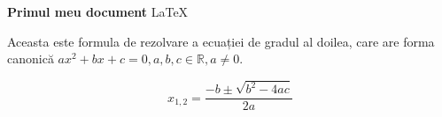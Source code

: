 \documentclass[a4paper]{article}
\begin{document}
\begin{center}
    {\Huge \textbf{Primul meu document} \LaTeX}
\end{center}

\vspace{1cm}

Aceasta este formula de rezolvare a ecuației de gradul al doilea,
care are forma canonică $ ax^2 + bx + c = 0, a, b, c \in \mathbb{R}, a \neq 0 $.

\[
    x_{1,2} = \frac{-b \pm \sqrt{b^2 - 4ac}}{2a}
\]
\end{document}
